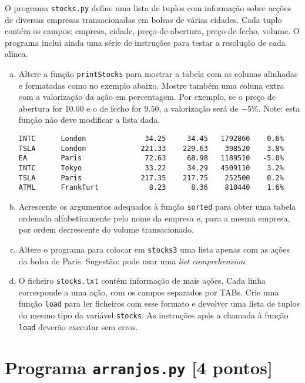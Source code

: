 \documentclass{article}
\renewcommand{\j}[1]{\texttt{#1}}
\begin{document}
O programa \j{stocks.py} define uma lista de tuplos com
informação sobre acções de diversas empresas
transacionadas em bolsas de várias cidades.
Cada tuplo contém os campos:
empresa, cidade, preço-de-abertura, preço-de-fecho, volume.
O programa inclui ainda uma série de instruções para testar
a resolução de cada alínea.
\begin{enumerate}[a)]
\item
Altere a função \j{printStocks}
para mostrar a tabela com
as colunas alinhadas e formatadas como no exemplo abaixo.
%
Mostre também uma coluna extra com a valorização da ação em percentagem.
Por exemplo, se o preço de abertura for $10.00$ e o de fecho for $9.50$,
a valorização será de $-5\%$.
Note: esta função não deve modificar a lista dada.

{\footnotesize
\begin{verbatim}
INTC      London              34.25     34.45   1792860    0.6%
TSLA      London             221.33    229.63    398520    3.8%
EA        Paris               72.63     68.98   1189510   -5.0%
INTC      Tokyo               33.22     34.29   4509110    3.2%
TSLA      Paris              217.35    217.75    252500    0.2%
ATML      Frankfurt            8.23      8.36    810440    1.6%
\end{verbatim}
}

\item
Acrescente os argumentos adequados à função \j{sorted}
para obter uma tabela ordenada alfabeticamente
pelo nome da empresa e, para a mesma empresa,
por ordem decrescente do volume transacionado.

\item
Altere o programa para colocar em \j{stocks3} uma lista
apenas com as ações da bolsa de Paris.
Sugestão: pode usar uma \emph{list comprehension}.

\item
O ficheiro \j{stocks.txt} contém informação de mais ações.
Cada linha corresponde a uma ação, com os campos separados por TABs.
Crie uma função \j{load} para ler ficheiros com esse formato
e devolver uma lista de tuplos do mesmo tipo da variável \j{stocks}.
As instruções após a chamada à função \j{load}
deverão executar sem erros.

\end{enumerate}


\section{Programa \j{arranjos.py} [4 pontos]}
\end{document}
